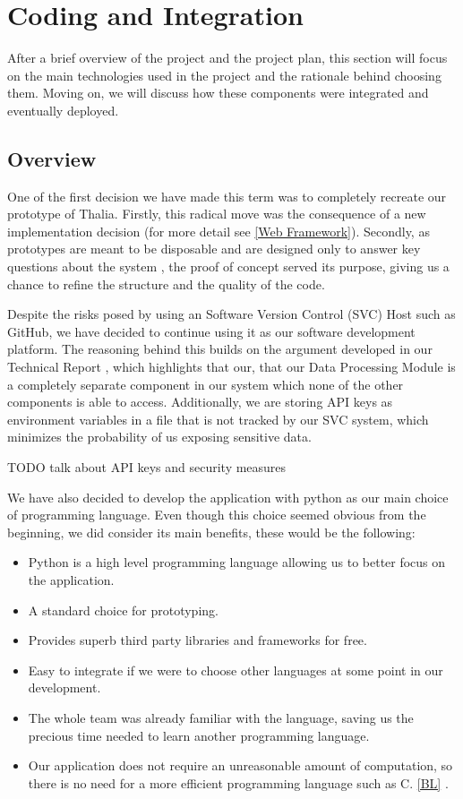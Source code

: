 \documentclass[main.tex]{subfiles}
\begin{document}
\section{Coding and Integration}

After a brief overview of the project and the project plan, this section will focus on the main technologies used in the project and the rationale behind choosing them. Moving on, we will discuss how these components were integrated and eventually deployed.

\subsection{Overview}

One of the first decision we have made this term was to completely recreate our prototype of Thalia. Firstly, this radical move was the consequence of a new implementation decision (for more detail see \ref{Web Framework}). Secondly, as prototypes are meant to be disposable and are designed only to answer key questions about the system \cite{pragmaticprog}, the proof of concept served its purpose, giving us a chance to refine the structure and the quality of the code.

Despite the risks posed by using an Software Version Control (SVC) Host such as GitHub, we have decided to continue using it as our software development platform. The reasoning behind this builds on the argument developed in our Technical Report \cite{TR_SVC}, which highlights that our, that our Data Processing Module is a completely separate component in our system which none of the other components is able to access. Additionally, we are storing API keys as environment variables in a file that is not tracked by our SVC system, which minimizes the probability of us exposing sensitive data.

TODO talk about API keys and security measures

We have also decided to develop the application with python as our main choice of programming language. Even though this choice seemed obvious from the beginning, we did consider its main benefits, these would be the following:

\begin{itemize}
    \item Python is a high level programming language allowing us to better focus on the application.
    \item A standard choice for prototyping.
    \item Provides superb third party libraries and frameworks for free.
    \item Easy to integrate if we were to choose other languages at some point in our development.
    \item The whole team was already familiar with the language, saving us the precious time needed to learn another programming language.
    \item Our application does not require an unreasonable amount of computation, so there is no need for a more efficient programming language such as C. \ref{BL} \cite{languagescomparison}.
\end{itemize}
\end{document}

